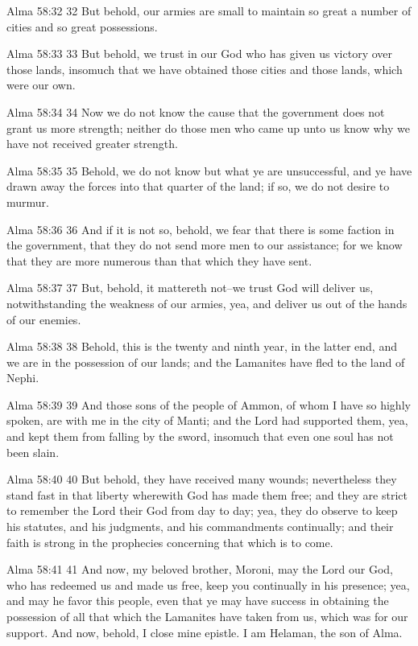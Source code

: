 Alma 58:32
 32 But behold, our armies are small to maintain so great a
number of cities and so great possessions.

Alma 58:33
 33 But behold, we trust in our God who has given us victory over
those lands, insomuch that we have obtained those cities and
those lands, which were our own.

Alma 58:34
 34 Now we do not know the cause that the government does not
grant us more strength; neither do those men who came up unto us
know why we have not received greater strength.

Alma 58:35
 35 Behold, we do not know but what ye are unsuccessful, and ye
have drawn away the forces into that quarter of the land; if so,
we do not desire to murmur.

Alma 58:36
 36 And if it is not so, behold, we fear that there is some
faction in the government, that they do not send more men to our
assistance; for we know that they are more numerous than that
which they have sent.

Alma 58:37
 37 But, behold, it mattereth not--we trust God will deliver us,
notwithstanding the weakness of our armies, yea, and deliver us
out of the hands of our enemies.

Alma 58:38
 38 Behold, this is the twenty and ninth year, in the latter end,
and we are in the possession of our lands; and the Lamanites have
fled to the land of Nephi.

Alma 58:39
 39 And those sons of the people of Ammon, of whom I have so
highly spoken, are with me in the city of Manti; and the Lord had
supported them, yea, and kept them from falling by the sword,
insomuch that even one soul has not been slain.

Alma 58:40
 40 But behold, they have received many wounds; nevertheless they
stand fast in that liberty wherewith God has made them free; and
they are strict to remember the Lord their God from day to day;
yea, they do observe to keep his statutes, and his judgments, and
his commandments continually; and their faith is strong in the
prophecies concerning that which is to come.

Alma 58:41
 41 And now, my beloved brother, Moroni, may the Lord our God,
who has redeemed us and made us free, keep you continually in his
presence; yea, and may he favor this people, even that ye may
have success in obtaining the possession of all that which the
Lamanites have taken from us, which was for our support. And
now, behold, I close mine epistle. I am Helaman, the son of
Alma.

